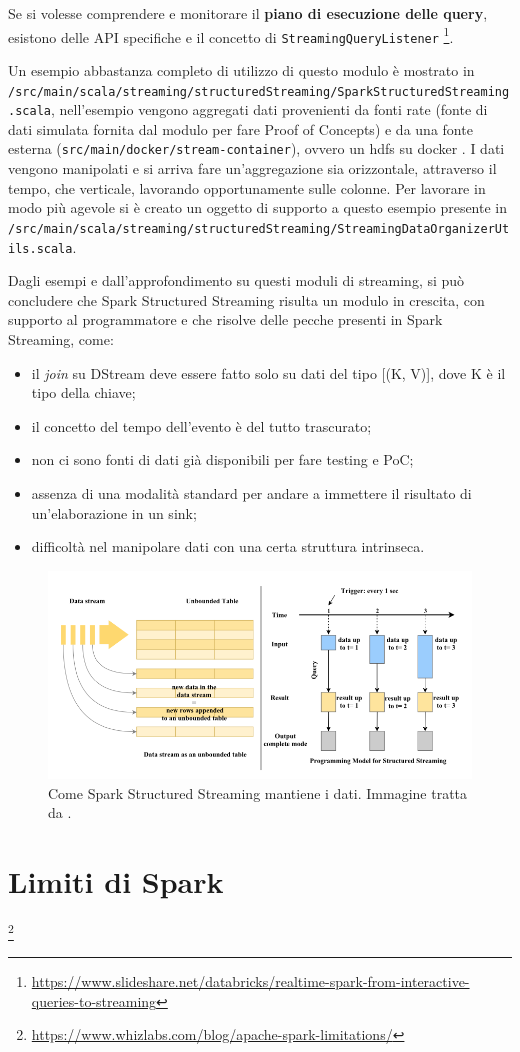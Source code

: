 \documentclass[12pt,italian]{article}
\begin{document}
\par Se si volesse comprendere e monitorare il \textbf{piano di esecuzione delle query}, esistono delle API specifiche e il concetto di \texttt{StreamingQueryListener} \footnote{\url{https://www.slideshare.net/databricks/realtime-spark-from-interactive-queries-to-streaming}}.

\par Un esempio abbastanza completo di utilizzo di questo modulo è mostrato in \texttt{/src/main/scala/streaming/structuredStreaming/SparkStructuredStreaming.scala}, nell'esempio vengono aggregati dati provenienti da fonti rate (fonte di dati simulata fornita dal modulo per fare Proof of Concepts) e da una fonte esterna (\texttt{src/main/docker/stream-container}), ovvero un hdfs su docker . I dati vengono manipolati e si arriva fare un'aggregazione sia orizzontale, attraverso il tempo, che verticale, lavorando opportunamente sulle colonne. Per lavorare in modo più agevole si è creato un oggetto di supporto a questo esempio presente in \texttt{/src/main/scala/streaming/structuredStreaming/StreamingDataOrganizerUtils.scala}.

\par Dagli esempi e dall'approfondimento su questi moduli di streaming, si può concludere che Spark Structured Streaming risulta un modulo in crescita, con supporto al programmatore e che risolve delle pecche presenti in Spark Streaming, come:
\begin{itemize}
	\item il \textit{join} su DStream deve essere fatto solo su dati del tipo [(K, V)], dove K è il tipo della chiave;
	\item il concetto del tempo dell'evento è del tutto trascurato;
	\item non ci sono fonti di dati già disponibili per fare testing e PoC;
	\item assenza di una modalità standard per andare a immettere il risultato di un'elaborazione in un sink;
	\item difficoltà nel manipolare dati con una certa struttura intrinseca.
\end{itemize}

\begin{figure}
	\centering 
	\includegraphics[width=0.8\linewidth]{img/sparkStructuredStreaming.png}
	\caption{Come Spark Structured Streaming mantiene i dati. Immagine tratta da \cite{structuredStreaming}.}
	\label{fig:StructuredStreaming}
\end{figure}
\section{Limiti di Spark}
\footnote{\url{https://www.whizlabs.com/blog/apache-spark-limitations/}}
\newpage
\printbibliography
\end{document}
